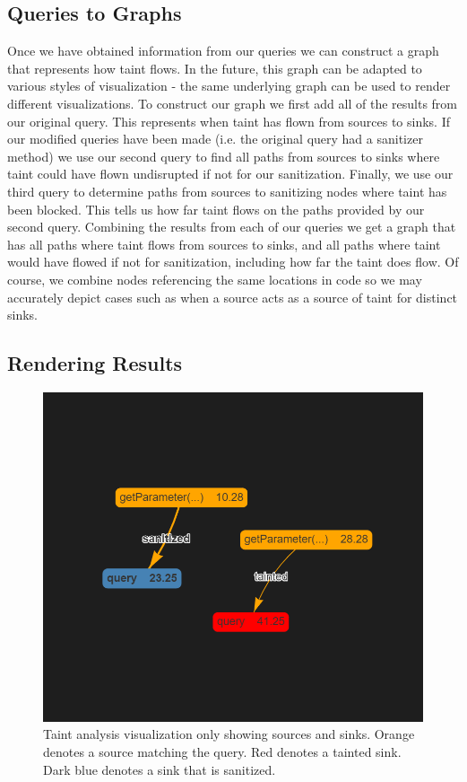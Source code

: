 \documentclass[sigplan,10pt,review]{acmart}
\begin{document}
\subsection{Queries to Graphs}
Once we have obtained information from our queries we can construct a graph that represents how taint flows. In the future, this graph can be adapted to various styles of visualization - the same underlying graph can be used to render different visualizations.
\newline
\indent To construct our graph we first add all of the results from our original query. This represents when taint has flown from sources to sinks. If our modified queries have been made (i.e. the original query had a sanitizer method) we use our second query to find all paths from sources to sinks where taint could have flown undisrupted if not for our sanitization. Finally, we use our third query to determine paths from sources to sanitizing nodes where taint has been blocked. This tells us how far taint flows on the paths provided by our second query. Combining the results from each of our queries we get a graph that has all paths where taint flows from sources to sinks, and all paths where taint would have flowed if not for sanitization, including how far the taint does flow. Of course, we combine nodes referencing the same locations in code so we may accurately depict cases such as when a source acts as a source of taint for distinct sinks.

\subsection{Rendering Results}

\begin{figure}[h]
  \centering
  \includegraphics[width=\linewidth]{taint_part}
  \caption{Taint analysis visualization only showing sources and sinks. Orange denotes a source matching the query. Red denotes a tainted sink. Dark blue denotes a sink that is sanitized.}
\end{figure}
\end{document}
